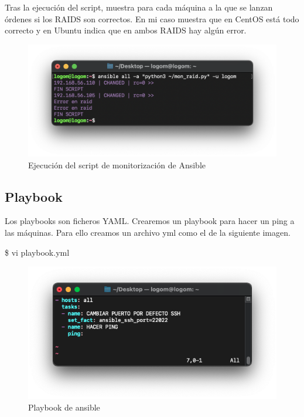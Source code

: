 Tras la ejecución del script, muestra para cada máquina a la que se lanzan órdenes si los RAIDS son correctos. En mi caso muestra que en CentOS está
todo correcto y en Ubuntu indica que en ambos RAIDS hay algún error.
    \begin{figure}[H]
        \centering
        \includegraphics[scale=0.6]{images/ejecucion_script.png}
        \caption{Ejecución del script de monitorización de Ansible}
        \label{fig:ejecucion_script}
    \end{figure}

\subsection{Playbook}
Los playbooks son ficheros YAML. Crearemos un playbook para hacer un ping a las máquinas. Para ello creamos un archivo
yml como el de la siguiente imagen.
    \begin{tcolorbox}[colback=black!10, halign=left]
        \$ vi playbook.yml
    \end{tcolorbox}

    \begin{figure}[H]
        \centering
        \includegraphics[scale=0.5]{images/playbook.png}
        \caption{Playbook de ansible}
        \label{fig:playbook}
    \end{figure}

